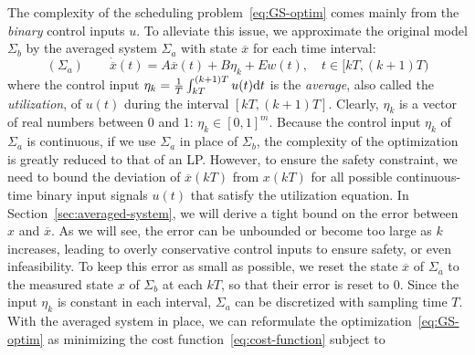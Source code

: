 The complexity of the %
scheduling problem~\eqref{eq:GS-optim} comes mainly from the \emph{binary} control inputs $u$.
To alleviate this issue, we %
approximate the original model $\Sigma_b$ by %
the averaged system $\Sigma_a$ with state $\overbar{x}$ for each time interval:
\begin{equation*}
(\Sigma_a) \qquad \dot{\overbar{x}} (t) = A \overbar{x} (t) + B \eta_k + Ew (t), \quad t \in [kT, (k + 1) T)
 \end{equation*}
where the control input $\eta_k = \frac{1}{T} \int_{kT}^{(k + 1) T} u (t) \mathrm{d} t$ is the \emph{average}, also called the \emph{utilization}, of $u (t)$ during the interval $[kT, (k + 1) T]$.
Clearly, $\eta_k$ is a vector of real numbers between $0$ and $1$: $\eta_k \in [0, 1]^m$.
Because the control input $\eta_k$ of $\Sigma_a$ is continuous, if we use $\Sigma_a$ in place of $\Sigma_b$, the complexity of the optimization is greatly reduced to that of an LP.
However, to ensure the safety constraint, we need to bound the deviation of $\overbar{x} (kT)$ from $x (kT)$ for all possible continuous-time binary input signals $u (t)$ that satisfy the utilization equation.
In Section~\ref{sec:averaged-system}, we will derive a tight bound on the error between $x$ and $\overbar{x}$.
As we will see, the error can be unbounded or become too large as $k$ increases, leading to overly conservative control inputs to ensure safety, or even infeasibility.
To keep this error as small as possible, we reset the state $\overbar{x}$ of $\Sigma_a$ to the measured state $x$ of $\Sigma_b$ at each $kT$, so that their error is reset to $0$.
Since the input $\eta_k$ is constant in each interval, $\Sigma_a$ can be discretized with sampling time $T$.
With the averaged system in place, we can reformulate the optimization~\eqref{eq:GS-optim} as minimizing the cost function~\eqref{eq:cost-function} subject to

